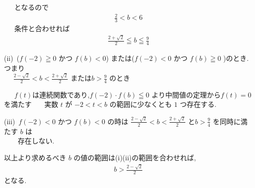 \documentclass[a4j,12pt]{jarticle}
\begin{document}
  　~となるので
   \begin{align*}
    \frac{2}{3} < b < 6
  \end{align*}
     　~条件と合わせれば
   \begin{align*}
    \frac{2+\sqrt{2}}{2} \leqq b \leqq \frac{9}{4}
  \end{align*}
  \begin{flushleft} 
     (ii)~($f(-2) \geqq 0$ かつ $f(b) < 0$)
     または($f(-2) < 0$ かつ $f(b) \geqq 0$ )のとき.つまり\\
     　 $\frac{2-\sqrt{2}}{2} < b < \frac{2+\sqrt{2}}{2}$
     または$ b > \frac{9}{4}$ のとき
  \end{flushleft}
  　~$f(t)$は連続関数であり,$f(-2) \cdot f(b) \leqq 0$ より中間値の定理から$f(t) = 0$ を満たす
   　~実数 $t$ が $-2<t<b$ の範囲に少なくとも $1$ つ存在する.
  \begin{flushleft} 
     (iii)~$f(-2) < 0$ かつ $f(b) < 0$ の時は
     $\frac{2-\sqrt{2}}{2} < b < \frac{2+\sqrt{2}}{2}$
     と$ b > \frac{9}{4}$ を同時に満たす $b$ は\\
     　　存在しない.
  \end{flushleft}
  以上より求めるべき $b$ の値の範囲は(i)(ii)の範囲を合わせれば,
  \begin{align*}
    b > \frac{2-\sqrt{2}}{2}
  \end{align*}
  となる.
\end{document}
